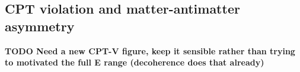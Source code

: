 \documentclass[a4paper,11pt]{article}
\begin{document}



\subsection{CPT violation and matter-antimatter asymmetry}

\textbf{TODO Need a new CPT-V figure, keep it sensible rather than trying to motivated the full E range (decoherence does that already)}
\end{document}
